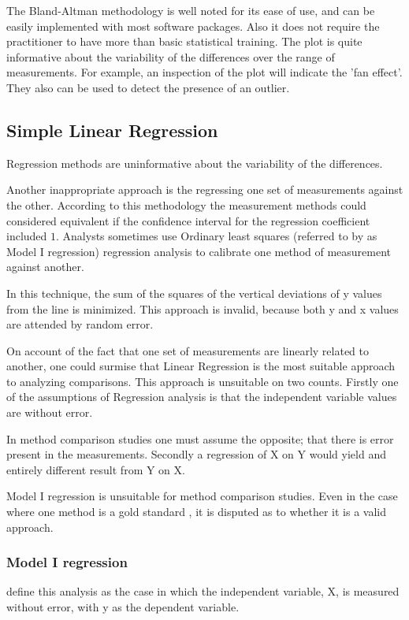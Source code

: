 \documentclass[12pt, a4paper]{report}
\theoremstyle{plain}
\theoremstyle{definition}
\theoremstyle{remark}
\begin{document}
	
	The Bland-Altman methodology is well noted for its ease of use,
	and can be easily implemented with most software packages. Also it
	does not require the practitioner to have more than basic
	statistical training. The plot is quite informative about the
	variability of the differences over the range of measurements. For
	example, an inspection of the plot will indicate the 'fan effect'.
	They also can be used to detect the presence of an outlier.
	
	\subsection{Simple Linear Regression}
	
	Regression methods are uninformative about the variability of the differences.
	
	Another inappropriate approach is the regressing one set of measurements against the other. According to this methodology the measurement methods could considered equivalent if the confidence interval for the regression coefficient included $1$. Analysts sometimes use Ordinary least squares (referred to by \citet{ludbrook97} as Model I regression) regression analysis to calibrate one method of measurement against another.
	
	In this technique, the sum of the squares of the vertical deviations of y values from the line is minimized. This approach is invalid, because both y and x values are attended by random error.
	
	On account of the fact that one set of measurements are linearly related to another, one could surmise that Linear Regression is the most suitable approach to analyzing comparisons. This approach is unsuitable on two counts. Firstly one of the assumptions of Regression analysis is that the independent variable values are without error. 
	
	In method comparison studies one must assume the opposite; that there is error present in the measurements. Secondly a regression of X on Y would yield and entirely different result from Y on X.
	
	Model I regression is unsuitable for method comparison studies. Even in the case where one method is a gold standard , it is disputed as to whether it is a valid approach. 
	\subsubsection{Model I regression}
	\citet{CornCoch} define this analysis as the case in which the independent variable, X, is measured without error, with y as the dependent variable.
	
\end{document}
